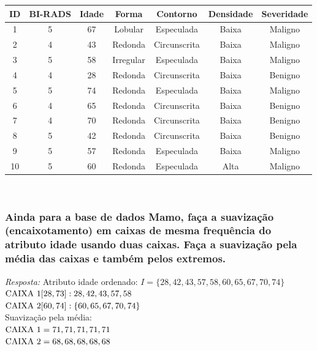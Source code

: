 \documentclass{article}
\begin{document}
\begin{enumerate}[label=\alph*]
  \begin{table}[H]
  \centering
  \begin{tabular}{|c|c|c|c|c|c|c|}
  \hline
  \rowcolor[HTML]{C0C0C0} 
  ID & BI-RADS & Idade & Forma     & Contorno     & Densidade & Severidade \\ \hline
  1  & 5       & 67    & Lobular   & Especulada   & Baixa     & Maligno    \\ \hline
  2  & 4       & 43    & Redonda   & Circunscrita & Baixa     & Maligno    \\ \hline
  3  & 5       & 58    & Irregular & Especulada   & Baixa     & Maligno    \\ \hline
  4  & 4       & 28    & Redonda   & Circunscrita & Baixa     & Benigno    \\ \hline
  5  & 5       & 74    & Redonda   & Especulada   & Baixa     & Maligno    \\ \hline
  6  & 4       & 65    & Redonda   & Circunscrita & Baixa     & Benigno    \\ \hline
  7  & 4       & 70    & Redonda   & Circunscrita & Baixa     & Benigno    \\ \hline
  8  & 5       & 42    & Redonda   & Circunscrita & Baixa     & Benigno    \\ \hline
  9  & 5       & 57    & Redonda   & Especulada   & Baixa     & Maligno    \\ \hline
  10 & 5       & 60    & Redonda   & Especulada   & Alta      & Maligno    \\ \hline
  \end{tabular} \\
  \end{table} 

\end{enumerate}

\subsubsection{Ainda para a base de dados Mamo, faça a suavização (encaixotamento) em caixas de mesma frequência do atributo idade usando duas caixas. Faça a suavização pela média das caixas e também pelos extremos.}
\textit{Resposta:} Atributo idade ordenado: 
$I = \{28, 42, 43, 57, 58, 60, 65, 67, 70, 74\}$ \\
$\textnormal{CAIXA 1}[28,73]: 28, 42, 43, 57, 58$ \\
$\textnormal{CAIXA 2}[60,74]:\{60, 65, 67, 70, 74\}$ \\

Suavização pela média: \\
$\textnormal{CAIXA 1} = 71, 71, 71, 71, 71$ \\
$\textnormal{CAIXA 2} = 68, 68, 68, 68, 68$ \\
\end{document}
